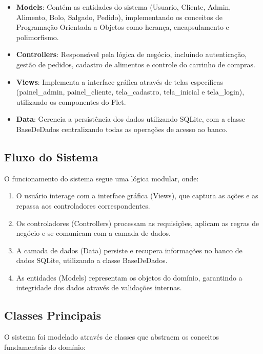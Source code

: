 \documentclass[conference]{IEEEtran}
\begin{document}
\begin{itemize}
    \item \textbf{Models}: Contém as entidades do sistema (Usuario, Cliente, Admin, Alimento, Bolo, Salgado, Pedido), implementando os conceitos de Programação Orientada a Objetos como herança, encapsulamento e polimorfismo.
    
    \item \textbf{Controllers}: Responsável pela lógica de negócio, incluindo autenticação, gestão de pedidos, cadastro de alimentos e controle do carrinho de compras.
    
    \item \textbf{Views}: Implementa a interface gráfica através de telas específicas (painel\_admin, painel\_cliente, tela\_cadastro, tela\_inicial e tela\_login), utilizando os componentes do Flet.
    
    \item \textbf{Data}: Gerencia a persistência dos dados utilizando SQLite, com a classe BaseDeDados centralizando todas as operações de acesso ao banco.
\end{itemize}

\subsection{Fluxo do Sistema}
O funcionamento do sistema segue uma lógica modular, onde:

\begin{enumerate}
    \item O usuário interage com a interface gráfica (Views), que captura as ações e as repassa aos controladores correspondentes.
    
    \item Os controladores (Controllers) processam as requisições, aplicam as regras de negócio e se comunicam com a camada de dados.
    
    \item A camada de dados (Data) persiste e recupera informações no banco de dados SQLite, utilizando a classe BaseDeDados.
    
    \item As entidades (Models) representam os objetos do domínio, garantindo a integridade dos dados através de validações internas.
\end{enumerate}

\subsection{Classes Principais}
O sistema foi modelado através de classes que abstraem os conceitos fundamentais do domínio:
\end{document}
